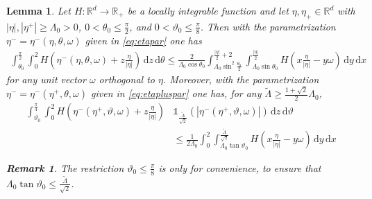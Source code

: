 \documentclass[11pt,a4paper,reqno]{amsart}
\theoremstyle{plain}
\newtheorem{lemma}[proposition]{Lemma}
\theoremstyle{definition}
\newtheorem{remark}[proposition]{Remark}
\begin{document}
\begin{lemma}\label{lem:change of variables}
Let $H:{\mathbb{R}}^d\to {\mathbb{R}}_+$ be a locally integrable function and let $\eta,\eta_+\in{\mathbb{R}}^d$ with $|\eta|,|\eta^+|\ge \Lambda_0>0$, $0<\theta_0 \le \tfrac{\pi}{2}$, and $0<\vartheta_0 \le \tfrac{\pi}{8}$.
Then with the parametrization $\eta^-=\eta^-(\eta,\theta,\omega)$ given in \eqref{eq:etapar} one has
\begin{align*}
	\int_{\theta_0}^{\tfrac{\pi}{2}} \int_0^2 H\left(\eta^-(\eta,\theta,\omega)+z\tfrac{\eta}{|\eta|}\right) \,\mathrm{d} z\, \mathrm{d}\theta
	\le \frac{2}{\Lambda_0\cos\theta_0}
		\int_{\Lambda_0\sin^2\tfrac{\theta_0}{2}}^{\tfrac{|\eta|}{2}+2}
		\int_{\Lambda_0\sin\theta_0}^{\tfrac{|\eta|}{2}}
			H\left(x\tfrac{\eta}{|\eta|} - y\omega\right)
			\,\mathrm{d} y\, \mathrm{d}x
\end{align*}
for any unit vector $\omega$ orthogonal to $\eta$.
Moreover, with the parametrization $\eta^-=\eta^-(\eta^+,\theta,\omega)$ given in \eqref{eq:etapluspar} one has, for any $\widetilde{\Lambda}\ge\frac{1+\sqrt{2}}{2}\Lambda_0$,
\begin{align*}
	\int_{\vartheta_0}^{\tfrac{\pi}{4}} \int_0^2 H\left(\eta^-(\eta^+,\vartheta,\omega)+z\tfrac{\eta}{|\eta|}\right) & {\mathds{1}}_{\tfrac{\widetilde{\Lambda}}{\sqrt{2}}}(|\eta^-(\eta^+,\vartheta,\omega)|)\,\mathrm{d} z\, \mathrm{d}\vartheta \\
	&\le
	\frac{1}{2\Lambda_0}
		\int_{0}^{2}
		\int_{\Lambda_0\tan\vartheta_0}^{\tfrac{\widetilde{\Lambda}}{\sqrt{2}}}
			H\left(x\tfrac{\eta}{|\eta|} - y\omega\right)
			\,\mathrm{d} y\, \mathrm{d}x
\end{align*}
\begin{remark}
	The restriction $\vartheta_0\le \tfrac{\pi}{8}$ is only for convenience, to ensure that
	$\Lambda_0\tan\vartheta_0\le \tfrac{\widetilde{\Lambda}}{\sqrt{2}}$.
\end{remark}


\end{lemma}
\end{document}
